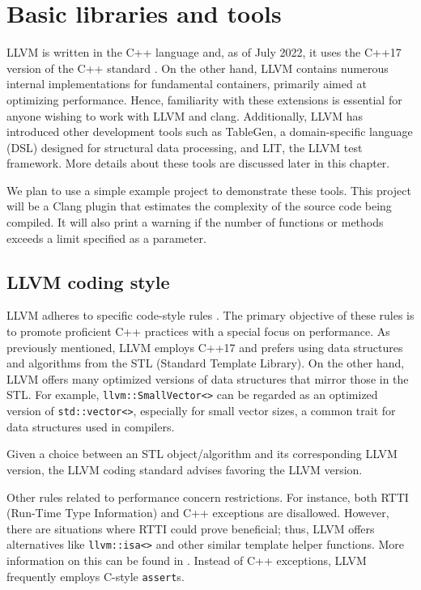 \chapter{Basic libraries and tools}
\pagestyle{fancy}
\fancyhf{}
\rhead{\thepage}
LLVM is written in the C++ language and, as of July 2022, it uses the C++17
version of the C++ standard \citep{llvm:cpp17migration}. On the other hand, LLVM
contains numerous internal implementations for fundamental containers, primarily
aimed at optimizing performance. Hence, familiarity with these extensions is
essential for anyone wishing to work with LLVM and clang. Additionally, LLVM has
introduced other development tools such as TableGen, a domain-specific language
(DSL) designed for structural data processing, and LIT, the LLVM test
framework. More details about these tools are discussed later in this chapter. 

We plan to use a simple example project to demonstrate these tools. This project
will be a Clang plugin that estimates the complexity of the source code being
compiled. It will also print a warning if the number of functions or methods
exceeds a limit specified as a parameter. 

\section{LLVM coding style}
LLVM adheres to specific code-style rules \citep{llvm:coding_standards}. The
primary objective of these rules is to promote proficient C++ practices with a
special focus on performance. As previously mentioned, LLVM employs C++17 and
prefers using data structures and algorithms from the STL (Standard Template
Library). On the other hand, LLVM offers many optimized versions of data
structures that mirror those in the STL. For example,
\texttt{llvm::SmallVector<>} can be regarded as an optimized version of
\texttt{std::vector<>}, especially for small vector sizes, a common
trait for data structures used in compilers. 

Given a choice between an STL object/algorithm and its corresponding LLVM
version, the LLVM coding standard advises favoring the LLVM version. 

Other rules related to performance concern restrictions. For instance, both RTTI
(Run-Time Type Information) and C++ exceptions are disallowed. However, there
are situations where RTTI could prove beneficial; thus, LLVM offers alternatives
like \texttt{llvm::isa<>} and other similar template helper
functions. More information on this can be found in
. Instead of C++ exceptions, LLVM frequently
employs C-style \texttt{assert}s.

